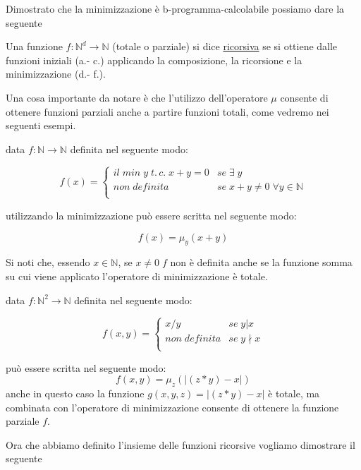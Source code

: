 Dimostrato che la minimizzazione \`e b-programma-calcolabile possiamo dare la
seguente
\begin{definizione} Una funzione $f:\mathbb{N}^{d} \to \mathbb{N}$ (totale o
parziale) si dice
\underline{ricorsiva} se si ottiene dalle funzioni iniziali (a.- c.) applicando
la composizione, la ricorsione e la minimizzazione (d.- f.).
\end{definizione}

Una cosa importante da notare \`e che l'utilizzo dell'operatore $\mu$ consente
di ottenere funzioni parziali anche a partire funzioni totali, come vedremo nei
seguenti esempi.
\begin{esempio} data $f:\mathbb{N} \to \mathbb{N}$ definita nel seguente modo:
\begin{center}
$$f(x)= \left\{ \begin{array}{ll}
il \; min \; y \; t. \, c. \; x+y=0 & se \; \exists \; y\\
non \; definita & se \; x+y \neq 0 \; \forall y \in \mathbb{N}\\
\end{array} \right.$$
\end{center}
utilizzando la minimizzazione pu\`o essere scritta nel seguente modo:
\begin{center}
$$f(x)= \mu_{y}(x+y)$$
\end{center}
Si noti che, essendo $x \in \mathbb{N}$, se $x \neq 0 \; f$ non \`e definita
anche se la funzione somma su cui viene applicato l'operatore di minimizzazione
\`e totale.
\end{esempio}

\begin{esempio} data $f:\mathbb{N}^{2} \to \mathbb{N}$ definita nel seguente
modo:
\begin{center}
$$f(x,y)= \left\{ \begin{array}{ll}
x/y & se \; y \vert x\\
non \; definita & se \; y \nmid x\\
\end{array} \right.$$
\end{center}
pu\`o essere scritta nel seguente modo:
$$f(x,y) = \mu_{z}(\vert (z*y) - x \vert) $$
anche in questo caso la funzione $g(x,y,z)=\vert (z*y) - x \vert$ \`e totale, ma
combinata con l'operatore di minimizzazione consente di ottenere la funzione
parziale $f$.
\end{esempio}

Ora che abbiamo definito l'insieme delle funzioni ricorsive vogliamo dimostrare
il seguente


